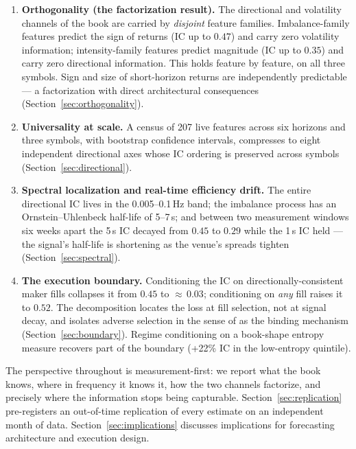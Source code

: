 \documentclass[11pt,a4paper]{article}
\theoremstyle{definition}
\theoremstyle{plain}
\begin{document}
\begin{enumerate}
\item \textbf{Orthogonality (the factorization result).} The
directional and volatility channels of the book are carried by
\emph{disjoint} feature families. Imbalance-family features predict
the sign of returns (IC up to $0.47$) and carry zero volatility
information; intensity-family features predict magnitude (IC up to
$0.35$) and carry zero directional information. This holds feature by
feature, on all three symbols. Sign and size of short-horizon returns
are independently predictable --- a factorization with direct
architectural consequences (Section~\ref{sec:orthogonality}).
\item \textbf{Universality at scale.} A census of 207 live features
across six horizons and three symbols, with bootstrap confidence
intervals, compresses to eight independent directional axes whose IC
ordering is preserved across symbols
(Section~\ref{sec:directional}).
\item \textbf{Spectral localization and real-time efficiency drift.}
The entire directional IC lives in the 0.005--0.1\,Hz band; the
imbalance process has an Ornstein--Uhlenbeck half-life of 5--7\,s; and
between two measurement windows six weeks apart the 5\,s IC decayed
from $0.45$ to $0.29$ while the 1\,s IC held --- the signal's
half-life is shortening as the venue's spreads tighten
(Section~\ref{sec:spectral}).
\item \textbf{The execution boundary.} Conditioning the IC on
directionally-consistent maker fills collapses it from $0.45$ to
${\approx}\,0.03$; conditioning on \emph{any} fill raises it to
$0.52$. The decomposition locates the loss at fill selection, not at
signal decay, and isolates adverse selection in the sense of
\citet{glosten1985} as the binding mechanism
(Section~\ref{sec:boundary}). Regime conditioning on a book-shape
entropy measure recovers part of the boundary (+22\% IC in the
low-entropy quintile).
\end{enumerate}

The perspective throughout is measurement-first: we report what the
book knows, where in frequency it knows it, how the two channels
factorize, and precisely where the information stops being capturable.
Section~\ref{sec:replication} pre-registers an out-of-time replication
of every estimate on an independent month of data.
Section~\ref{sec:implications} discusses implications for forecasting
architecture and execution design.

\end{document}
